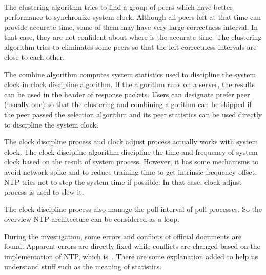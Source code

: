 The clustering algorithm tries to find a group of peers which have better
performance to synchronize system clock. Although all peers left at that time
can provide accurate time, some of them may have very large correctness
interval. In that case, they are not confident about where is the accurate
time. The clustering algorithm tries to eliminates some peers so that the left
correctness intervals are close to each other.

The combine algorithm computes system statistics used to discipline the system
clock in clock discipline algorithm. If the algorithm runs on a server, the
results can be used in the header of response packets. Users can designate
prefer peer (usually one) so that the clustering and combining algorithm can be
skipped if the peer passed the selection algorithm and its peer statistics can
be used directly to discipline the system clock.

The clock discipline process and clock adjust process actually works with
system clock. The clock discipline algorithm discipline the time and frequency
of system clock based on the result of system process. However, it has some
mechanisms to avoid network spike and to reduce training time to get intrinsic
frequency offset. NTP tries not to step the system time if possible. In that
case, clock adjust process is used to slew it.

The clock discipline process also manage the poll interval of poll processes.
So the overview NTP architecture can be considered as a loop.

During the investigation, some errors and conflicts of official documents are
found. Apparent errors are directly fixed while conflicts are changed based on
the implementation of NTP, which is~\cite{source_code}. There are some
explanation added to help us understand stuff such as the meaning of
statistics. 

